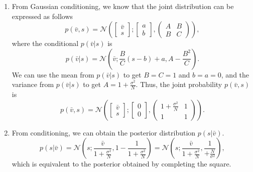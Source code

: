 \begin{enumerate}[label=\alph*.]
\item From Gaussian conditioning, we know that the joint distribution can be expressed as follows
\begin{equation}
p(\bar{v},s) = \mathcal{N}\left( \left[\begin{array}{c}
\bar{v}\\
s
\end{array}\right]; \left[\begin{array}{c}
a\\
b
\end{array}\right], \left(\begin{array}{cc}
A & B\\
B & C
\end{array}\right) \right),
\end{equation}
where the conditional $p(\bar{v}|s)$ is
\begin{equation}
p(\bar{v}|s) = \mathcal{N}\left(\bar{v}; \frac{B}{C}(s-b) + a,A - \frac{B^2}{C}\right).
\end{equation}
We can use the mean from $p(\bar{v}|s)$ to get $B=C=1$ and $b=a=0$, and the variance from $p(\bar{v}|s)$ to get $A=1 + \frac{\sigma^2}{N}$. Thus, the joint probability $p(\bar{v},s)$ is
\begin{equation}
p(\bar{v},s) = \mathcal{N}\left( \left[\begin{array}{c}
\bar{v}\\
s
\end{array}\right]; \left[\begin{array}{c}
0\\
0
\end{array}\right], \left(\begin{array}{cc}
1 + \frac{\sigma^2}{N} & 1\\
1 & 1
\end{array}\right) \right).
\end{equation}

\item From conditioning, we can obtain the posterior distribution $p(s| \bar{v})$.
\begin{equation}
p(s| \bar{v}) = \mathcal{N}\left(s; \frac{\bar{v}}{1 + \frac{\sigma^2}{N}}, 1 - \frac{1}{1 + \frac{\sigma^2}{N}}\right) = \mathcal{N}\left(s; \frac{\bar{v}}{1 + \frac{\sigma^2}{N}}, \frac{1}{ + \frac{N}{\sigma^2}}\right),
\end{equation}
which is equivalent to the posterior obtained by completing the square.

\end{enumerate}




